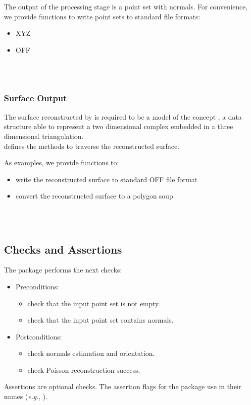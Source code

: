 The output of the processing stage is a point set with normals.
For convenience, we provide functions to write point sets to standard file formats:

\begin{itemize}
\item XYZ
\item OFF
\end{itemize}

  \\
  \\


\subsubsection{Surface Output}

The surface reconstructed by 
is required to be a model of the concept
,
a data structure able to represent a two dimensional
complex embedded in a three dimensional triangulation. \\
 defines the methods to traverse the reconstructed surface.

As examples, we provide functions to:

\begin{itemize}
\item write the reconstructed surface to standard OFF file format
\item convert the reconstructed surface to a polygon soup
\end{itemize}

  \\
  \\


\subsection{Checks and Assertions}

The package performs the next checks:

\begin{itemize}
\item Preconditions:
    \begin{itemize}
    \item check that the input point set is not empty.
    \item check that the input point set contains normals.
    \end{itemize}
\item Postconditions:
    \begin{itemize}
    \item check normals estimation and orientation.
    \item check Poisson reconstruction success.
    \end{itemize}
\end{itemize}

Assertions are optional checks. The assertion flags for the package
use  in their names (\textit{e.g.},
).


